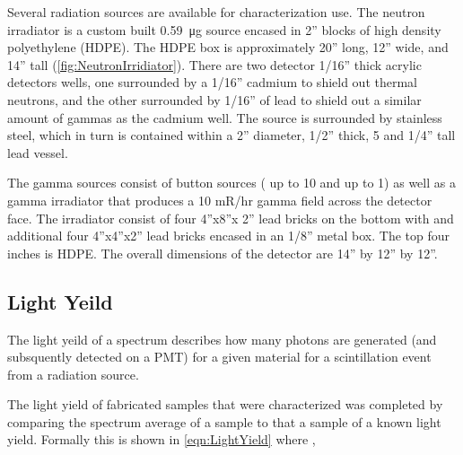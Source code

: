 Several radiation sources are available for characterization use.
The neutron irradiator is a custom built \SI{0.59}{\ug}  source encased in 2” blocks of high density polyethylene (HDPE). 
The HDPE box is approximately 20” long, 12” wide, and 14” tall (\autoref{fig:NeutronIrridiator}). 
There are two detector 1/16” thick acrylic detectors wells, one surrounded by a 1/16” cadmium to shield out thermal neutrons, and the other surrounded by 1/16” of lead to shield out a similar amount of gammas as the cadmium well.
The  source is surrounded by stainless steel, which in turn is contained within a 2” diameter, 1/2” thick, 5 and 1/4” tall lead vessel.
\begin{figure}
  \centering
  \label{fig:NeutronIrridiator}
\end{figure}
The gamma sources consist of button sources ( up to \SI{10}{\uCi} and  up to \SI{1}{\uCi}) as well as a gamma irradiator that produces a 10 mR/hr gamma field across the detector face. 
The irradiator consist of four 4”x8”x 2” lead bricks on the bottom with and additional four 4”x4”x2” lead bricks encased in an 1/8” metal box. 
The top four inches is HDPE. 
The overall dimensions of the detector are 14” by 12” by 12”. 
\subsection{Light Yeild}
The light yeild of a spectrum describes how many photons are generated (and subsquently detected on a PMT) for a given material for a scintillation event from a radiation source.

The light yield of fabricated samples that were characterized was completed by comparing the spectrum average of a sample to that a sample of a known light yield.
Formally this is shown in \eqref{eqn:LightYield} where , 

